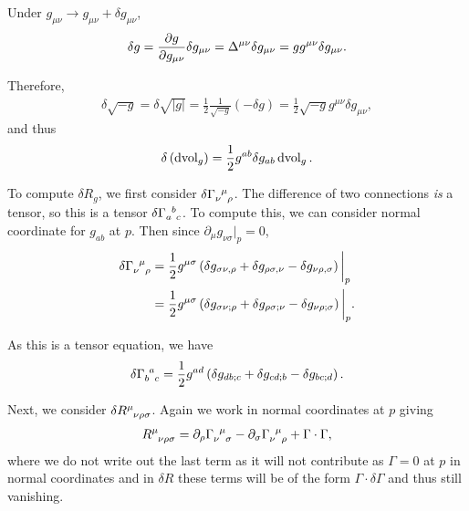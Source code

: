 Under $g_{\mu \nu} \to g_{\mu \nu} + \delta g_{\mu \nu}$,
\begin{align}
    \delta g = \pdv{g}{g_{\mu \nu}} \delta g_{\mu \nu} = \Delta^{\mu \nu} \delta g_{\mu \nu} = g g^{\mu \nu} \delta g_{\mu \nu}
.\end{align}

Therefore,
\begin{align}
    \delta \sqrt{-g}  = \delta \sqrt{\left| g \right| }  =\frac{1}{2} \frac{1}{\sqrt{-g} } \left( -\delta g \right)  = \frac{1}{2} \sqrt{-g}  g^{\mu \nu} \delta g_{\mu \nu}
,\end{align}
and thus
\begin{align}
    \delta \left( \dd{\text{vol}}_g \right) = \frac{1}{2} g^{ab} \delta g_{ab} \dd{\text{vol}}_g
.\end{align}

To compute $\delta R_g$, we first consider $\delta \tensor{\Gamma}{_{\nu}^{\mu}_\rho}$. The difference of two connections \emph{is} a tensor, so this is a tensor $\delta \tensor{\Gamma}{_{a}^{b}_c}$. To compute this, we can consider normal coordinate for $g_{ab}$ at $p$. Then since $\partial_\mu g_{\nu \sigma} \bigg|_p = 0$,
\begin{align}
    \delta \tensor{\Gamma}{_\nu^{\mu}_\rho} &= \frac{1}{2} g^{\mu \sigma} \left( \delta g_{\sigma \nu , \rho} + \delta g_{\rho \sigma,\nu} - \delta g_{\nu \rho ,\sigma}  \right) \bigg|_p \\
    &= \frac{1}{2} g^{\mu \sigma} \left( \delta g_{\sigma \nu ; \rho} + \delta g_{\rho \sigma ; \nu} - \delta g_{\nu \rho; \sigma} \right) \bigg|_p 
.\end{align}

As this is a tensor equation, we have
\begin{align}
    \delta \tensor{\Gamma}{_b^{a}_c} = \frac{1}{2} g^{ad} \left( \delta g_{db;c} + \delta g_{cd;b} - \delta g_{bc ;d} \right) 
.\end{align}

Next, we consider $\delta \tensor{R}{^{\mu}_{\nu \rho \sigma}}$. Again we work in normal coordinates at $p$ giving
\begin{align}
    \tensor{R}{^{\mu}_{\nu \rho \sigma}} = \partial_\rho \tensor{\Gamma}{_\nu^{\mu}_\sigma} - \partial_\sigma \tensor{\Gamma}{_\nu^{\mu}_\rho} + \Gamma \cdot \Gamma
,\end{align}
where we do not write out the last term as it will not contribute as $\Gamma = 0$ at $p$ in normal coordinates and in $\delta R$ these terms will be of the form $\Gamma \cdot \delta \Gamma$ and thus still vanishing.

